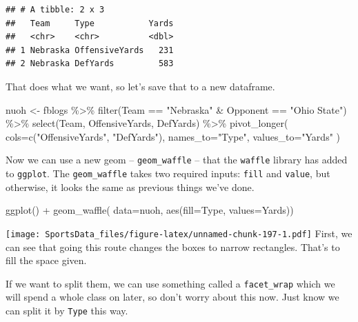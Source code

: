 \documentclass[
]{book}
\newenvironment{Shaded}{\begin{snugshade}}{\end{snugshade}}
\newcommand{\AttributeTok}[1]{\textcolor[rgb]{0.77,0.63,0.00}{#1}}
\newcommand{\FunctionTok}[1]{\textcolor[rgb]{0.00,0.00,0.00}{#1}}
\newcommand{\NormalTok}[1]{#1}
\newcommand{\OtherTok}[1]{\textcolor[rgb]{0.56,0.35,0.01}{#1}}
\newcommand{\SpecialCharTok}[1]{\textcolor[rgb]{0.00,0.00,0.00}{#1}}
\newcommand{\StringTok}[1]{\textcolor[rgb]{0.31,0.60,0.02}{#1}}
\begin{document}
\begin{verbatim}
## # A tibble: 2 x 3
##   Team     Type           Yards
##   <chr>    <chr>          <dbl>
## 1 Nebraska OffensiveYards   231
## 2 Nebraska DefYards         583
\end{verbatim}

That does what we want, so let's save that to a new dataframe.

\begin{Shaded}
\begin{Highlighting}[]
\NormalTok{nuoh }\OtherTok{\textless{}{-}}\NormalTok{ fblogs }\SpecialCharTok{\%\textgreater{}\%} 
        \FunctionTok{filter}\NormalTok{(Team }\SpecialCharTok{==} \StringTok{"Nebraska"} \SpecialCharTok{\&}\NormalTok{ Opponent }\SpecialCharTok{==} \StringTok{"Ohio State"}\NormalTok{) }\SpecialCharTok{\%\textgreater{}\%} 
        \FunctionTok{select}\NormalTok{(Team, OffensiveYards, DefYards) }\SpecialCharTok{\%\textgreater{}\%} 
        \FunctionTok{pivot\_longer}\NormalTok{(}
                \AttributeTok{cols=}\FunctionTok{c}\NormalTok{(}\StringTok{"OffensiveYards"}\NormalTok{, }\StringTok{"DefYards"}\NormalTok{), }
                \AttributeTok{names\_to=}\StringTok{"Type"}\NormalTok{, }
                \AttributeTok{values\_to=}\StringTok{"Yards"}
\NormalTok{                )}
\end{Highlighting}
\end{Shaded}

Now we can use a new geom -- \texttt{geom\_waffle} -- that the \texttt{waffle} library has added to \texttt{ggplot}. The \texttt{geom\_waffle} takes two required inputs: \texttt{fill} and \texttt{value}, but otherwise, it looks the same as previous things we've done.

\begin{Shaded}
\begin{Highlighting}[]
\FunctionTok{ggplot}\NormalTok{() }\SpecialCharTok{+} \FunctionTok{geom\_waffle}\NormalTok{(}
  \AttributeTok{data=}\NormalTok{nuoh,}
  \FunctionTok{aes}\NormalTok{(}\AttributeTok{fill=}\NormalTok{Type, }\AttributeTok{values=}\NormalTok{Yards))}
\end{Highlighting}
\end{Shaded}

\texttt{[image: SportsData\_files/figure-latex/unnamed-chunk-197-1.pdf]}
First, we can see that going this route changes the boxes to narrow rectangles. That's to fill the space given.

If we want to split them, we can use something called a \texttt{facet\_wrap} which we will spend a whole class on later, so don't worry about this now. Just know we can split it by \texttt{Type} this way.
\end{document}
